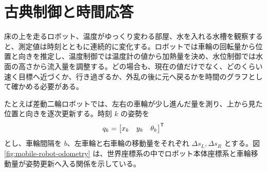 \section{古典制御と時間応答}

床の上を走るロボット、温度がゆっくり変わる部屋、水を入れる水槽を観察すると、測定値は時刻とともに連続的に変化する。ロボットでは車輪の回転量から位置と向きを推定し、温度制御では温度計の値から加熱量を決め、水位制御では水面の高さから流入量を調整する。どの場合も、現在の値だけでなく、どのくらい速く目標へ近づくか、行き過ぎるか、外乱の後に元へ戻るかを時間のグラフとして確かめる必要がある。

たとえば差動二輪ロボットでは、左右の車輪が少し進んだ量を測り、上から見た位置と向きを逐次更新する。時刻 $k$ の姿勢を
\begin{equation}
  q_k=\begin{bmatrix}x_k&y_k&\theta_k\end{bmatrix}^{\mathsf{T}}
\end{equation}
とし、車輪間隔を $b$、左車輪と右車輪の移動量をそれぞれ $\Delta s_L,\Delta s_R$ とする。図\ref{fig:mobile-robot-odometry} は、世界座標系の中でロボット本体座標系と車輪移動量が姿勢更新へ入る関係を示している。

